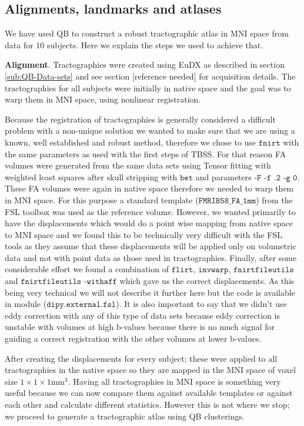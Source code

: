 \documentclass[preprint,authoryear,a4paper,10pt,onecolumn]{elsarticle}
\begin{document}
\subsection{Alignments, landmarks and atlases\label{sub:Atlases-made-easy}}

We have used QB to construct a robust tractographic atlas in MNI space
from data for 10 subjects. Here we explain the steps we used to achieve
that.

\textbf{Alignment}. Tractographies were created using EuDX as described
in section \ref{sub:QB-Data-sets} and see section
[reference needed] for acquisition details. The
tractographies for all subjects were initially in native space and the
goal was to warp them in MNI space, using nonlinear registration.

Because the registration of tractographies is generally considered a
difficult problem with a non-unique solution we wanted to make sure that
we are using a known, well established and robust method, therefore we
chose to use $\texttt{fnirt}$ with the same parameters as used with the
first steps of TBSS\cite{Smith2006NeuroImage}. For that reason FA
volumes were generated from the same data sets using Tensor fitting with
weighted least squares after skull stripping with $\texttt{bet}$ and
parameters $\texttt{-F -f .2 -g 0}$. These FA volumes were again in
native space therefore we needed to warp them in MNI space. For this
purpose a standard template ($\texttt{FMRIB58\_FA\_1mm}$) from the FSL
toolbox was used as the reference volume. However, we wanted primarily
to have the displacements which would do a point wise mapping from
native space to MNI space and we found this to be technically very
difficult with the FSL tools as they assume that these displacements
will be applied only on volumetric data and not with point data as those
used in tractographies. Finally, after some considerable effort we found
a combination of $\texttt{flirt}$, $\texttt{invwarp}$,
$\texttt{fnirtfileutils}$ and $\texttt{fnirtfileutils -withaff}$ which
gave us the correct displacements. As this being very technical we will
not describe it further here but the code is available in module
($\texttt{dipy.external.fsl}$). It is also important to say that we
didn't use eddy correction with any of this type of data sets because
eddy correction is unstable with volumes at high b-values because there
is no much signal for guiding a correct registration with the other
volumes at lower b-values.

After creating the displacements for every subject; these were applied
to all tractographies in the native space so they are mapped in the MNI
space of voxel size $1\times1\times1\textrm{mm}^{3}$. Having all
tractographies in MNI space is something very useful because we can now
compare them against available templates or against each other and
calculate different statistics. However this is not where we stop; we
proceed to generate a tractographic atlas using QB clusterings.
\end{document}
